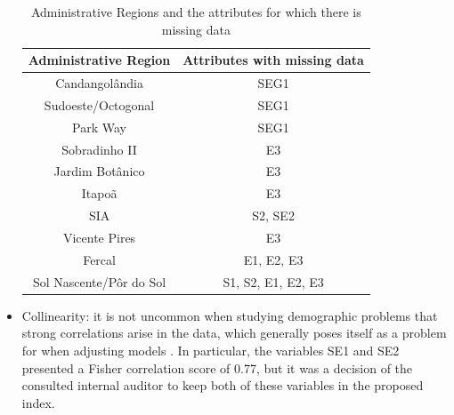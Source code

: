 \documentclass[conference]{IEEEtran}
\begin{document}
\begin{itemize}
\begin{table}
\centering
\begin{tabular}{|c|c|}
\hline
\textbf{Administrative Region} & \textbf{Attributes with missing data} \\
\hline
Candangolândia & SEG1 \\
\hline
Sudoeste/Octogonal & SEG1 \\
\hline
Park Way & SEG1 \\
\hline
Sobradinho II & E3 \\
\hline
Jardim Botânico & E3 \\
\hline
Itapoã & E3 \\
\hline
SIA & S2, SE2 \\
\hline
Vicente Pires & E3 \\
\hline
Fercal & E1, E2, E3 \\
\hline
Sol Nascente/Pôr do Sol & S1, S2, E1, E2, E3 \\
\hline
\end{tabular}
\caption{Administrative Regions and the attributes for which there is missing data}
\label{tab:colunas-NA}
\end{table}



\item Collinearity: it is not uncommon when studying demographic problems that strong correlations arise in the data, which generally poses itself as a problem for when adjusting models \cite{hill2001collinearity}. In particular, the variables SE1 and SE2 presented a Fisher correlation score of 0.77, but it was a decision of the consulted internal auditor to keep both of these variables in the proposed index. 


\end{itemize}
\end{document}
